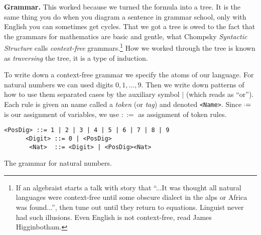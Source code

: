 \medskip
\noindent \textbf{Grammar.}
This worked because we turned the formula into a tree.  It is the
same thing you do when you diagram a sentence in grammar school, only with
English you can sometimes get cycles.  That we got a tree is owed to the fact
that the grammars for mathematics are basic and gentle, what Chompsky 
\emph{Syntactic Structure} calls
\emph{context-free} grammars.\footnote{
    If an algebraist starts a talk with story that ``...It was thought  all natural 
    languages were context-free until some obscure dialect in the alps or Africa was found...'', 
    then tune out until they return to equations.  
    Linguist never had such illusions. Even English is not context-free, read  James Higginbotham.}  
How we worked through the tree is known as \emph{traversing}
the tree, it is a type of induction.

To write down a context-free grammar we specify the atoms of our language.
For natural numbers we can used digits $0,1,\ldots, 9$.  Then we write down patterns of how to use them
separated cases by the auxiliary symbol $|$ (which reads as ``or'').  Each rule 
is given an name called a \emph{token} (or \emph{tag}) and denoted \lstinline{<Name>}.
Since $\defeq$ is our assignment of variables, we use $::=$ as assignment of token rules.
\begin{lstfloat}
\begin{lstlisting}[mathescape]
     <PosDig> ::= 1 | 2 | 3 | 4 | 5 | 6 | 7 | 8 | 9 
      <Digit> ::= 0 | <PosDig>
       <Nat>  ::= <Digit> | <PosDig><Nat>
\end{lstlisting}
\caption{The grammar for natural numbers.}
\end{lstfloat}

